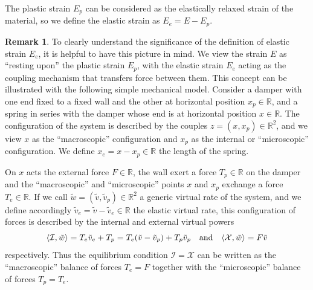 \documentclass[a4paper,10pt,twoside]{amsbook}
\numberwithin{section}{chapter}
\numberwithin{equation}{chapter}
\theoremstyle{definition}
\newtheorem{rmk}[prop]{Remark}
\DeclarePairedDelimiter{\dual}{\langle}{\rangle}
\begin{document}
The plastic strain $E_p$ can be considered as the elastically relaxed strain of the material, so we define the elastic strain as $E_e=E-E_p$.
\begin{rmk}
\label{rmk:plasticity-simplified}
To clearly understand the significance of the definition of elastic strain $E_e$, it is helpful to have this picture in mind. We view the strain $E$ as ``resting upon'' the plastic strain $E_p$, with the elastic strain $E_e$ acting as the coupling mechanism that transfers force between them. This concept can be illustrated with the following simple mechanical model. Consider a damper with one end fixed to a fixed wall and the other at horizontal position $x_p\in\mathbb{R}$, and a spring in series with the damper whose end is at horizontal position $x\in\mathbb{R}$. The configuration of the system is described by the couples $z=(x,x_p)\in\mathbb{R}^2$, and we view $x$ as the ``macroscopic'' configuration and $x_p$ as the internal or ``microscopic'' configuration. We define $x_e=x-x_p\in\mathbb{R}$ the length of the spring.
\begin{center}
\end{center}
On $x$ acts the external force $F\in\mathbb{R}$, the wall exert a force $T_p\in\mathbb{R}$ on the damper and the ``macroscopic'' and ``microscopic'' points $x$ and $x_p$ exchange a force $T_e\in\mathbb{R}$. If we call $\tilde w=(\tilde v,\tilde v_p)\in\mathbb{R}^2$ a generic virtual rate of the system, and we define accordingly $\tilde v_e=\tilde v-\tilde v_e\in\mathbb{R}$ the elastic virtual rate, this configuration of forces is described by the internal and external virtual powers
\[
\dual{\mathcal{I},\tilde w}=T_e\tilde v_e+T_p=T_e(\tilde v-\tilde v_p)+T_p\tilde v_p\quad\text{and}\quad\dual{\mathcal{X},\tilde w}=F\tilde v
\]
respectively. Thus the equilibrium condition $\mathcal{I}=\mathcal{X}$ can be written as the ``macroscopic'' balance of forces $T_e=F$ together with the ``microscopic'' balance of forces $T_p=T_e$.
\end{rmk}
\end{document}
